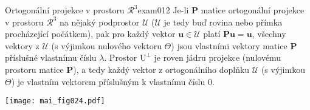 \begin{mathexam}{Ortogonální projekce v prostoru \(\mathcal{R}^3\)}{exam012}
    Je-li \(\mathbf{P}\) matice ortogonální projekce v prostoru \(\mathcal{R}^3\) na nějaký 
    podprostor \(\mathcal{U}\) (\(\mathcal{U}\) je tedy buď rovina nebo přímka procházející 
    počátkem), pak pro každý vektor \(\mathbf{u}\in\mathcal{U}\) platí \(\mathbf{Pu} = 
    \mathbf{u}\), všechny vektory z \(\mathcal{U}\) (s výjimkou nulového vektoru \(\Theta\)) 
    jsou vlastními vektory matice $\mathbf{P}$ příslušné vlastnímu číslu \(\lambda\). Prostor 
    \(\mathrm{U}^\bot\) je roven jádru projekce (nulovému prostoru matice \(\mathbf{P}\)), 
    a tedy každý vektor z ortogonálního doplňku \(\mathcal{U}\) (s výjimkou \(\Theta\)) je 
    vlastním vektorem příslušným k vlastnímu číslu \(0\).

    {\centering
      \captionsetup{type=figure}
      \texttt{[image: mai\_fig024.pdf]}
      \label{mai:FIG016}
      \par}

\end{mathexam}